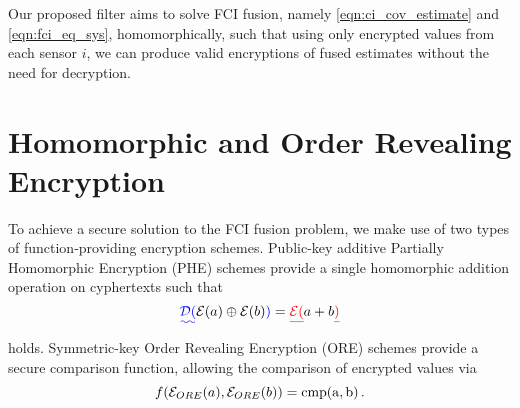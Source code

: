 \documentclass[letterpaper, 10 pt, conference]{ieeeconf}  %
\providecommand{\DIFadd}[1]{{\protect\color{blue}\uwave{#1}}} %
\providecommand{\DIFdel}[1]{{\protect\color{red}\sout{#1}}}                      %
\providecommand{\DIFaddbegin}{} %
\providecommand{\DIFaddend}{} %
\providecommand{\DIFdelbegin}{} %
\providecommand{\DIFdelend}{} %
\begin{document}
Our proposed filter aims to solve FCI fusion, namely \eqref{eqn:ci_cov_estimate} and \eqref{eqn:fci_eq_sys}, homomorphically, such that using only encrypted values from each sensor $i$, we can produce valid encryptions of fused estimates without the need for decryption.




\section{Homomorphic and Order Revealing Encryption} \label{sec:encryption}
To achieve a secure solution to the FCI fusion problem, we make use of two types of function-providing encryption schemes. Public-key additive Partially Homomorphic Encryption (PHE) schemes \cite{paillierPublicKeyCryptosystemsBased1999,goldwasserProbabilisticEncryption1984} provide a single homomorphic addition operation \DIFaddbegin \DIFadd{$\oplus$ }\DIFaddend on cyphertexts such that
\begin{equation}
   \DIFaddbegin \DIFadd{\mathcal{D}(}\DIFaddend \mathcal{E}(a) \oplus \mathcal{E}(b)\DIFaddbegin \DIFadd{) }\DIFaddend = \DIFdelbegin \DIFdel{\mathcal{E}(}\DIFdelend a+b \DIFdelbegin \DIFdel{) }\DIFdelend \label{eqn:phe_eq}
\end{equation}
holds. Symmetric-key Order Revealing Encryption (ORE) schemes \cite{chenettePracticalOrderRevealingEncryption2016,lewiOrderRevealingEncryptionNew2016} provide a secure comparison function, allowing the comparison of encrypted values via
\begin{equation}
   f(\mathcal{E}_{ORE}(a), \mathcal{E}_{ORE}(b)) = \operatorfont{cmp}(a, b)\,. \label{eqn:ore_eq}
\end{equation}
\end{document}
